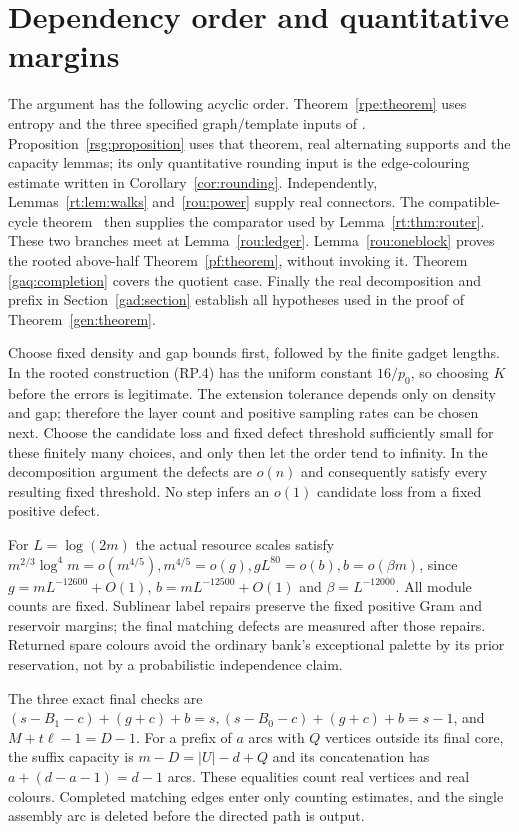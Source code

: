 \appendix
\section{Dependency order and quantitative margins}\label{app:audit}
The argument has the following acyclic order. Theorem~\ref{rpe:theorem}
uses entropy and the three specified graph/template inputs of
\cite{Montgomery}. Proposition~\ref{rsg:proposition} uses that theorem,
real alternating supports and the capacity lemmas; its only quantitative
rounding input is the edge-colouring estimate written in
Corollary~\ref{cor:rounding}. Independently, Lemmas~\ref{rt:lem:walks}
and~\ref{rou:power} supply real connectors. The compatible-cycle
theorem~\cite[Theorem 3.4]{BMMP} then supplies the comparator used by
Lemma~\ref{rt:thm:router}. These two branches meet at
Lemma~\ref{rou:ledger}. Lemma~\ref{rou:oneblock} proves the rooted
above-half Theorem~\ref{pf:theorem}, without invoking it. Theorem~
\ref{gaq:completion} covers the quotient case. Finally the real
decomposition and prefix in Section~\ref{gad:section} establish all
hypotheses used in the proof of Theorem~\ref{gen:theorem}.

Choose fixed density and gap bounds first, followed by the finite
gadget lengths. In the rooted construction (RP.4) has the uniform
constant $16/p_0$, so choosing $K$ before the errors is legitimate. The extension tolerance depends only on density and gap; therefore
the layer count and positive sampling rates can be chosen next.
Choose the candidate loss and fixed defect threshold sufficiently
small for these finitely many choices, and only then let the order
tend to infinity. In the decomposition argument the defects are $o(n)$ and consequently satisfy every resulting fixed threshold. No step infers an $o(1)$ candidate loss from a fixed positive defect.

For $L=\log(2m)$ the actual resource scales satisfy $m^{2/3}\log^4m=o(m^{4/5}),m^{4/5}=o(g),gL^{80}=o(b),b=o(\beta{}m)$, since $g=mL^{-12600}+O(1)$, $b=mL^{-12500}+O(1)$ and $\beta=L^{-12000}$. All module counts are fixed. Sublinear label repairs preserve the fixed positive Gram and reservoir margins;
the final matching defects are measured after those repairs.
Returned spare colours avoid the ordinary bank's exceptional palette
by its prior reservation, not by a probabilistic independence claim.

The three exact final checks are $(s-B_1-c)+(g+c)+b=s,(s-B_0-c)+(g+c)+b=s-1$, and $M+t\ell-1=D-1$. For a prefix of $a$ arcs with $Q$ vertices outside its final core, the suffix capacity is $m-D=|U|-d+Q$ and its concatenation has $a+(d-a-1)=d-1$ arcs. These equalities count real vertices and real colours. Completed
matching edges enter only counting estimates, and the single
assembly arc is deleted before the directed path is output.
